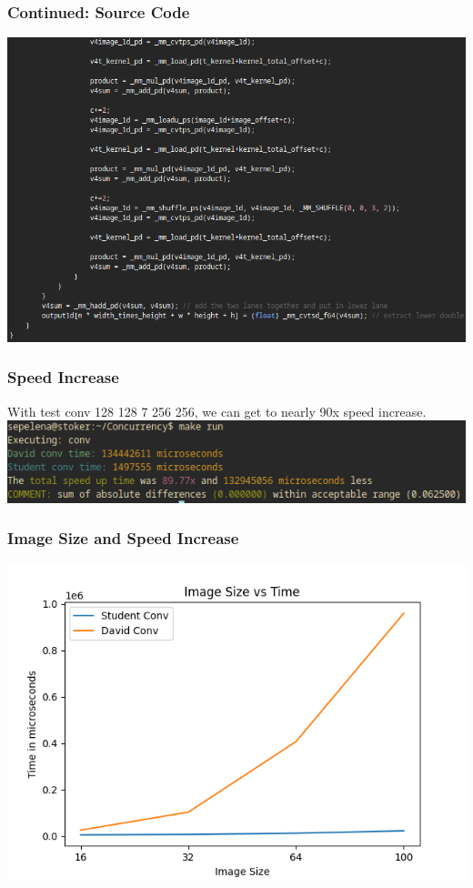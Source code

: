\documentclass{beamer}
\begin{document}
\begin{frame}[fragile]
\frametitle{Continued: Source Code}
\includegraphics[width=1\textwidth]{images/student-conv-part3}
\end{frame}

\begin{frame}[fragile]
\frametitle{Speed Increase}
With test conv 128 128 7 256 256, we can get to nearly 90x speed increase. \\
\includegraphics[width=1\textwidth]{images/stoker-89x}
\end{frame}

\begin{frame}[fragile]
\frametitle{Image Size and Speed Increase}
\includegraphics[width=1\textwidth]{images/Image_size_vs_time_X-X-5-32-32}
\end{frame}
\end{document}
